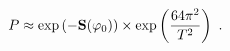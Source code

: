 \begin{equation}\label{thin3}
P\approx \exp\left({-{{\bf S}(\varphi_0) }}\right)\times \exp\left({64\pi^2\over T^2}\right)
\ .
\end{equation}

